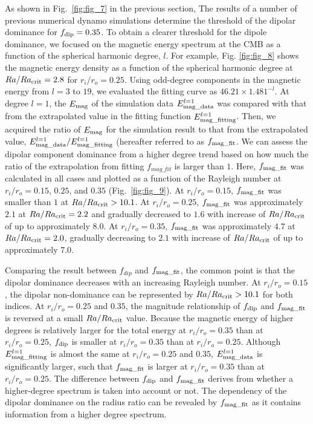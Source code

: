 {\color{blue}
As shown in Fig.~\ref{fig:fig_7} in the previous section, 
}
The results of a number of previous numerical dynamo simulations determine the threshold of the dipolar dominance for $f_{\rm dip} = 0.35$. 
To obtain a clearer threshold for the dipole dominance, we focused on the magnetic energy spectrum at the CMB as a function of the spherical harmonic degree, $l$. 
For example, Fig. \ref{fig:fig_8} shows the magnetic energy density as a function of the spherical harmonic degree at $Ra/Ra_{\rm crit} = 2.8$ for $r_i/r_o = 0.25$. 
Using odd-degree components in the magnetic energy from $l = 3$ to $19$, we evaluated the fitting curve as $46.21 \times 1.481^{-l}$. 
At degree $l = 1$, the $E_{\rm mag}$ of the simulation data $E_{\rm mag\_data}^{l = 1}$ was compared with that from the extrapolated value in the fitting function $E_{\rm mag\_fitting}^{l = 1}$. 
Then, we acquired the ratio of $E_{\rm mag}$ for the simulation result to that from the extrapolated value, $E_{\rm mag\_data}^{l = 1}/E_{\rm mag\_fitting}^{l=1}$ (hereafter referred to as $f_{\rm mag\_fit}$. 
We can assess the dipolar component dominance from a higher degree trend based on how much the ratio of the extrapolation from fitting $f_{mag\_fit}$ is larger than $1$. 
Here, $f_{\rm mag\_fit}$ was calculated in all cases and plotted as a function of the Rayleigh number at $r_i/r_o = 0.15$, $0.25$, and $0.35$ (Fig.~\ref{fig:fig_9}). 
At $r_i/r_o = 0.15$, $f_{\rm mag\_fit}$ was smaller than $1$ at $Ra/Ra_{\rm crit} > 10.1$. 
At $r_i/r_o = 0.25$, $f_{\rm mag\_fit}$ was approximately $2.1$ at $Ra/Ra_{\rm crit} = 2.2$ and gradually decreased to $1.6$ with increase of $Ra/Ra_{\rm crit}$ of up to approximately $8.0$. 
At $r_i/r_o = 0.35$, $f_{\rm mag\_fit}$ was approximately $4.7$ at $Ra/Ra_{\rm crit} = 2.0$, gradually decreasing to $2.1$ with increase of $Ra/Ra_{\rm crit}$ of up to approximately $7.0$.

Comparing the result between $f_{dip}$ and $f_{\rm mag\_fit}$, the common point is that the dipolar dominance decreases with an increasing Rayleigh number. 
At $r_i/r_o = 0.15$, the dipolar non-dominance can be represented by $Ra/Ra_{\rm crit} > 10.1$ for both indices. 
At $r_i/r_o = 0.25$ and $0.35$, the magnitude relationship of $f_{\rm dip}$ and $f_{\rm mag\_fit}$ is reversed at a small $Ra/Ra_{\rm crit}$ value. 
Because the magnetic energy of higher degrees is relatively larger for the total energy at $r_i/r_o = 0.35$ than at $r_i/r_o = 0.25$, $f_{\rm dip}$ is smaller at $r_i/r_o = 0.35$ than at $r_i/r_o = 0.25$. 
Although $E_{\rm mag\_fitting}^{l = 1}$ is almost the same at $r_i/r_o = 0.25$ and $0.35$, $E_{\rm mag\_data}^{l = 1}$ is significantly larger, such that $f_{\rm mag\_fit}$ is larger at $r_i/r_o = 0.35$ than at $r_i/r_o = 0.25$. 
The difference between $f_{\rm dip}$ and $f_{\rm mag\_fit}$ derives from whether a higher-degree spectrum is taken into account or not. 
The dependency of the dipolar dominance on the radius ratio can be revealed by $f_{\rm mag\_fit}$ as it contains information from a higher degree spectrum.

